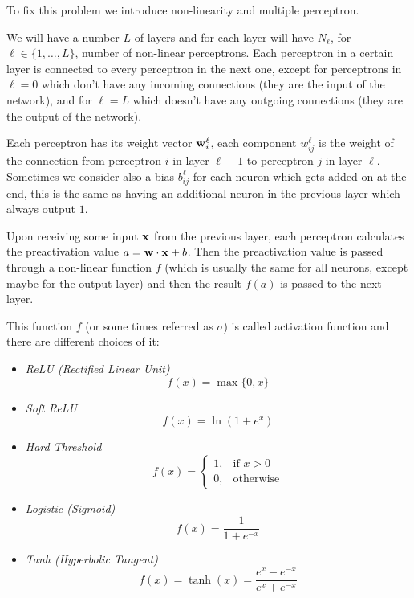 \documentclass[12pt]{extarticle}
\renewcommand{\vec}[1]{\bvec{#1}}
\begin{document}
To fix this problem we introduce non-linearity and multiple perceptron.

We will have a number $L$ of layers and for each layer will have $N_\ell$,
for $\ell \in \{1, \dots, L\}$, number of non-linear perceptrons.
Each perceptron in a certain layer is connected to every perceptron in the next one, except for
perceptrons in $\ell = 0$ which don't have any incoming connections (they are the input of the
network), and for $\ell = L$ which doesn't have any outgoing connections (they are the output of the
network).

Each perceptron has its weight vector $\vec w^\ell_i$, each component $w^\ell_{ij}$ is the weight of
the connection from perceptron $i$ in layer $\ell -1$ to perceptron $j$ in layer $\ell$.
Sometimes we consider also a bias $b^\ell_{ij}$ for each neuron which gets added on at the end, this
is the same as having an additional neuron in the previous layer which always output $1$.

Upon receiving some input $\vec x$ from the previous layer, each perceptron calculates the
preactivation value $a = \vec w \cdot \vec x + b$. Then the preactivation value is passed through a
non-linear function $f$ (which is usually the same for all neurons, except maybe for the output
layer) and then the result $f(a)$ is passed to the next layer.

This function $f$ (or some times referred as $\sigma$) is called activation function and there
are different choices of it:
\begin{itemize}
	\item \emph{ReLU (Rectified Linear Unit)}
	      \begin{equation}
		      f(x) = \max \{0, x \}
	      \end{equation}
	\item \emph{Soft ReLU}
	      \begin{equation}
		      f(x) = \ln(1 + e^x)
	      \end{equation}
	\item \emph{Hard Threshold}
	      \begin{equation}
		      f(x) =
		      \begin{cases}
			      1, & \text{if } x > 0 \\
			      0, & \text{otherwise}
		      \end{cases}
	      \end{equation}
	\item \emph{Logistic (Sigmoid)}
	      \begin{equation}
		      f(x) = \frac{1}{1 + e^{-x}}
	      \end{equation}
	\item \emph{Tanh (Hyperbolic Tangent)}
	      \begin{equation}
		      f(x) = \tanh(x) = \frac{e^x - e^{-x}}{e^x + e^{-x}}
	      \end{equation}
\end{itemize}
\end{document}
